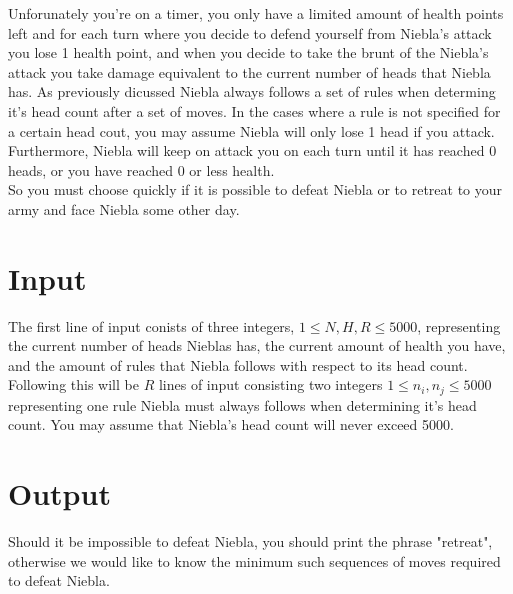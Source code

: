 \noindent Unforunately you're on a timer, you only have a limited amount of health points left and for each turn where
you decide to defend yourself from Niebla's attack you lose 1 health point, and when you decide to take the brunt of the
Niebla's attack you take damage equivalent to the current number of heads that Niebla has. As previously dicussed Niebla
always follows a set of rules when determing it's head count after a set of moves. In the cases where a rule is not
specified for a certain head cout, you may assume Niebla will only lose 1 head if you attack. Furthermore, Niebla will
keep on attack you on each turn until it has reached 0 heads, or you have reached 0 or less health. \\

\noindent So you must choose quickly if it is possible to defeat Niebla or to retreat to your army and face Niebla
some other day.\\

\section*{Input}

The first line of input conists of three integers, $1 \leq N, H, R \leq 5000$, representing the current number of heads
Nieblas has, the current amount of health you have, and the amount of rules that Niebla follows with respect to its
head count. Following this will be $R$ lines of input consisting two integers $1 \leq n_i , n_j \leq 5000$ representing one
rule Niebla must always follows when determining it's head count. You may assume that Niebla's head count will never
exceed 5000. \\

\section*{Output}
Should it be impossible to defeat Niebla, you should print the phrase "retreat", otherwise we would like to know the
minimum such sequences of moves required to defeat Niebla. \\

